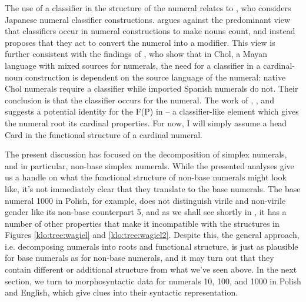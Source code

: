 \documentclass[output=paper]{langscibook}
\begin{document}


\begin{sloppypar}
The use of a classifier in the structure of the numeral relates to \citet{sudo2016semantic}, who considers Japanese numeral classifier constructions. \citet{sudo2016semantic} argues against the predominant view that classifiers occur in numeral constructions to make nouns count, and instead proposes that they act to convert the numeral into a modifier. This view is further consistent with the findings of \citet{bale2014classifiers}, who show that in Chol, a Mayan language with mixed sources for numerals, the need for a classifier in a cardinal-noun construction is dependent on the source language of the numeral: native Chol numerals require a classifier while imported Spanish numerals do not. Their conclusion is that the classifier occurs for the numeral. The work of \citet{wagiel2017several,wagiel2018fasl}, \citet{sudo2016semantic}, and \citet{bale2014classifiers} suggests a potential identity for the F(P) in  -- a classifier-like element which gives the numeral root its cardinal properties. For now, I will simply assume a head Card in the functional structure of a cardinal numeral.
\end{sloppypar}

The present discussion has focused on the decomposition of simplex numerals, and in particular, non-base simplex numerals. While the presented analyses give us a handle on what the functional structure of non-base numerals might look like, it's not immediately clear that they translate to the base numerals. The base numeral 1000 in Polish, for example, does not distinguish virile and non-virile gender like its non-base counterpart 5, and as we shall see shortly in , it has a number of other properties that make it incompatible with the structures in Figures \ref{klo:tree:wagiel} and \ref{klo:tree:wagiel2}. Despite this, the general approach, i.e. decomposing numerals into roots and functional structure, is just as plausible for base numerals as for non-base numerals, and it may turn out that they contain different or additional structure from what we've seen above. In the next section, we turn to morphosyntactic data for numerals 10, 100, and 1000 in Polish and English, which give clues into their syntactic representation.
\end{document}
